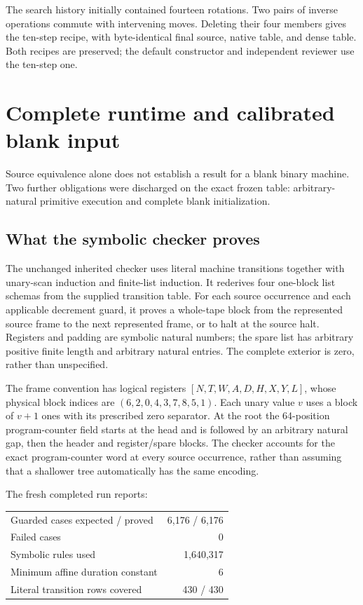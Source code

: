 \documentclass[11pt]{article}
\newcommand{\file}[1]{\texttt{\detokenize{#1}}}
\begin{document}
The search history initially contained fourteen rotations. Two pairs of
inverse operations commute with intervening moves. Deleting their four
members gives the ten-step recipe, with byte-identical final source,
native table, and dense table. Both recipes are preserved; the default
constructor and independent reviewer use the ten-step one.

\section{Complete runtime and calibrated blank input}
\label{sec:runtime}

Source equivalence alone does not establish a result for a blank binary
machine. Two further obligations were discharged on the exact frozen
table: arbitrary-natural primitive execution and complete blank
initialization.

\subsection{What the symbolic checker proves}

The unchanged inherited checker \file{runtime/runtime/symbolic_runtime.py}
uses literal machine transitions together with unary-scan induction and
finite-list induction. It rederives four one-block list schemas from
the supplied transition table. For each source occurrence and each
applicable decrement guard, it proves a whole-tape block from the
represented source frame to the next represented frame, or to halt at
the source halt. Registers and padding are symbolic natural numbers;
the spare list has arbitrary positive finite length and arbitrary
natural entries. The complete exterior is zero, rather than unspecified.

The frame convention has logical registers
$[N,T,W,A,D,H,X,Y,L]$, whose physical block indices are
$(6,2,0,4,3,7,8,5,1)$. Each unary value $v$ uses a block of $v+1$
ones with its prescribed zero separator. At the root the 64-position
program-counter field starts at the head and is followed by an arbitrary
natural gap, then the header and register/spare blocks. The checker accounts for
the exact program-counter word at every source occurrence, rather than
assuming that a shallower tree automatically has the same encoding.

The fresh completed run reports:
\begin{center}
\begin{tabular}{lr}
\toprule
Guarded cases expected / proved & 6,176 / 6,176\\
Failed cases & 0\\
Symbolic rules used & 1,640,317\\
Minimum affine duration constant & 6\\
Literal transition rows covered & 430 / 430\\
\bottomrule
\end{tabular}
\end{center}
\end{document}
